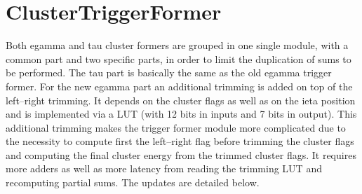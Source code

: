 \documentclass[a4paper, 12pt]{article}
\begin{document}
\section{ClusterTriggerFormer}
Both egamma and tau cluster formers are grouped in one single module, with a common part and two specific parts, in order to limit the duplication of sums to be performed. 
%
The tau part is basically the same as the old egamma trigger former. 
%
For the new egamma part an additional trimming is added on top of the left--right trimming. It depends on the cluster flags as well as on the ieta position and is implemented via a LUT (with 12 bits in inputs and 7 bits in output).
%
This additional trimming makes the trigger former module more complicated due to the necessity to compute first the left--right flag before trimming the cluster flags and computing the final cluster energy from the trimmed cluster flags. It requires more adders as well as more latency from reading the trimming LUT and recomputing partial sums. The updates are detailed below.


\end{document}
